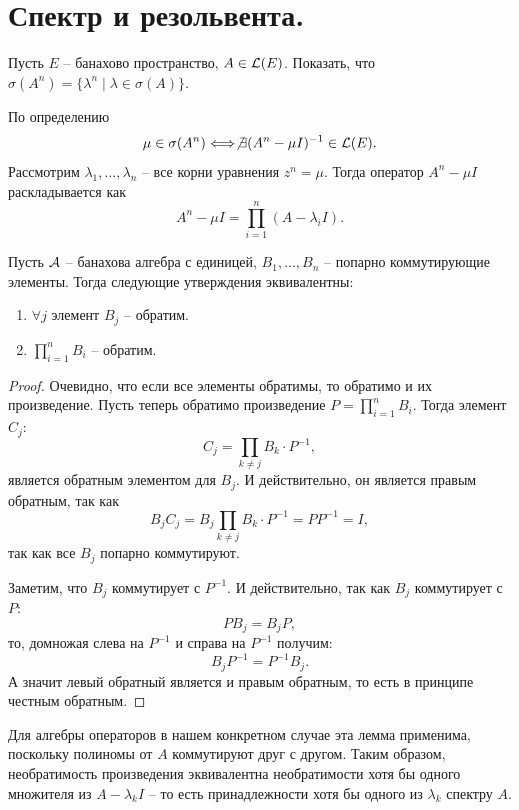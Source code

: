 \section{Спектр и резольвента.}
\begin{task}[7.1]
    Пусть $E$ -- банахово пространство, $A \in \mathcal{L}(E)$.
    Показать, что $\sigma(A^n) = \{\lambda^n \mid \lambda \in \sigma(A)\}$.
\end{task}
\begin{solution}
    По определению
    \[
        \mu \in \sigma(A^n) \Longleftrightarrow \not\exists (A^n - \mu I)^{-1} \in \mathcal{L}(E).
    \]
    Рассмотрим $\lambda_1, \ldots, \lambda_n$ -- все корни уравнения $z^n = \mu$.
    Тогда оператор $A^n - \mu I$ раскладывается как
    \[
        A^n - \mu I = \prod_{i = 1}^{n} (A - \lambda_i I).
    \]
    \begin{lemma}
        Пусть $\mathcal{A}$ -- банахова алгебра с единицей, $B_1, \ldots, B_n$ -- попарно коммутирующие элементы.
        Тогда следующие утверждения эквивалентны:
        \begin{enumerate}
            \item $\forall j$ элемент $B_j$ -- обратим.
            \item $\prod_{i = 1}^{n}B_i$ -- обратим.
        \end{enumerate}
    \end{lemma}
    \begin{proof}
        Очевидно, что если все элементы обратимы, то обратимо и их произведение.
        Пусть теперь обратимо произведение $P = \prod_{i = 1}^{n}B_i$.
        Тогда элемент $C_j\colon$
        \[
            C_j = \prod_{k \neq j}B_k \cdot P^{-1},
        \]
        является обратным элементом для $B_j$.
        И действительно, он является правым обратным, так как
        \[
            B_jC_j = B_j\prod_{k \neq j}B_k \cdot P^{-1} = PP^{-1} = I,
        \]
        так как все $B_j$ попарно коммутируют.
        
        Заметим, что $B_j$ коммутирует с $P^{-1}$.
        И действительно, так как $B_j$ коммутирует с $P$:
        \[
            PB_j = B_jP,
        \]
        то, домножая слева на $P^{-1}$ и справа на $P^{-1}$ получим:
        \[
            B_j P^{-1} = P^{-1}B_j.
        \]
        А значит левый обратный является и правым обратным, то есть в принципе честным обратным.
    \end{proof}
    
    Для алгебры операторов в нашем конкретном случае эта лемма применима, поскольку полиномы от $A$ коммутируют друг с другом.
    Таким образом, необратимость произведения эквивалентна необратимости хотя бы одного множителя из $A - \lambda_k I$ -- то есть принадлежности хотя бы одного из $\lambda_k$ спектру $A$.
\end{solution}
